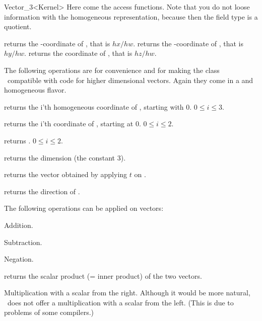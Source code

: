 \begin{ccRefClass} {Vector_3<Kernel>}
Here come the  access functions. Note that you do not loose
information with the homogeneous representation, because then the field
type is a quotient.


       {returns the -coordinate of \ccVar, that is $hx/hw$.}
\ccGlue
{}
       {returns the -coordinate of \ccVar, that is $hy/hw$.}
\ccGlue
{}
       {returns the  coordinate of \ccVar, that is $hz/hw$.}

The following operations are for convenience and for making the
class \ccRefName\ compatible with code for higher dimensional vectors.
Again they come in a  and homogeneous flavor.

       {returns the i'th homogeneous coordinate of \ccVar, starting with 0.
        \ccPrecond $0\leq i \leq 3$.}

       {returns the i'th  coordinate of \ccVar, starting at 0.
        \ccPrecond $0\leq i \leq 2$.}

       {returns  .
        \ccPrecond $0\leq i \leq 2$.}

       {returns the dimension (the constant 3).}

       {returns the vector obtained by applying $t$ on \ccVar.}

       {returns the direction of \ccVar.}


The following operations can be applied on vectors:

       {Addition.}

       {Subtraction.}

       {Negation.}

       {returns the scalar product (= inner product) of the two vectors.}


       {Multiplication with a scalar from the right. Although it would
        be more natural, \cgal\ does not offer a multiplication with a 
        scalar from the left. (This is due to problems of some compilers.)}



\end{ccRefClass}
